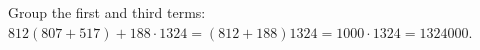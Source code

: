 Group the first and third terms: $812(807+517)+188\cdot1324=(812+188)1324=1000\cdot1324=\boxed{1324000}$.
